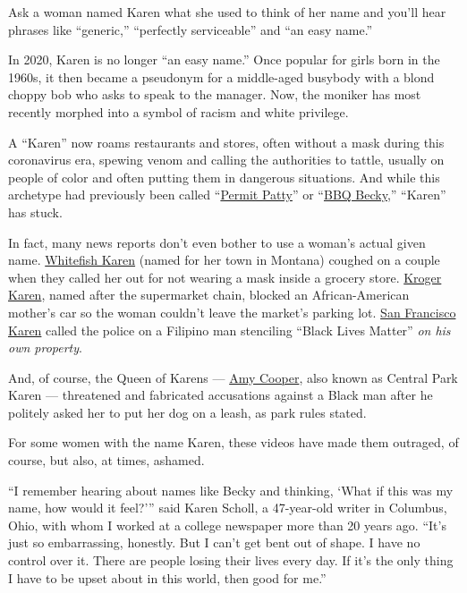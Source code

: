 Ask a woman named Karen what she used to think of her name and you'll
hear phrases like ``generic,'' ``perfectly serviceable'' and ``an easy
name.''

In 2020, Karen is no longer ``an easy name.'' Once popular for girls
born in the 1960s, it then became a pseudonym for a middle-aged busybody
with a blond choppy bob who asks to speak to the manager. Now, the
moniker has most recently morphed into a symbol of racism and white
privilege.

A ``Karen'' now roams restaurants and stores, often without a mask
during this coronavirus era, spewing venom and calling the authorities
to tattle, usually on people of color and often putting them in
dangerous situations. And while this archetype had previously been
called
``\href{https://www.cnn.com/2018/06/25/us/permit-patty-san-francisco-trnd/index.html}{Permit
Patty}'' or
``\href{https://www.newsweek.com/bbq-becky-white-woman-who-called-cops-black-bbq-911-audio-released-im-really-1103057}{BBQ
Becky},'' ``Karen'' has stuck.

In fact, many news reports don't even bother to use a woman's actual
given name. \href{https://www.youtube.com/watch?v=qHqzg3vgW4I}{Whitefish
Karen} (named for her town in Montana) coughed on a couple when they
called her out for not wearing a mask inside a grocery store.
\href{https://www.metrotimes.com/news-hits/archives/2020/06/17/metro-detroits-own-kroger-karen-prevents-black-customer-from-leaving-the-parking-lot-in-viral-video}{Kroger
Karen}, named after the supermarket chain, blocked an African-American
mother's car so the woman couldn't leave the market's parking lot.
\href{https://sfist.com/2020/06/14/sf-karen-filmed-confronting-pacific-heights-man-over-writing-black-lives-matter-on-his-property/}{San
Francisco Karen} called the police on a Filipino man stenciling ``Black
Lives Matter'' \emph{on his own property}.

And, of course, the Queen of Karens ---
\href{https://www.nytimes.com/2020/06/14/nyregion/central-park-amy-cooper-christian-racism.html}{Amy
Cooper}, also known as Central Park Karen --- threatened and fabricated
accusations against a Black man after he politely asked her to put her
dog on a leash, as park rules stated.

For some women with the name Karen, these videos have made them
outraged, of course, but also, at times, ashamed.

``I remember hearing about names like Becky and thinking, `What if this
was my name, how would it feel?''' said Karen Scholl, a 47-year-old
writer in Columbus, Ohio, with whom I worked at a college newspaper more
than 20 years ago. ``It's just so embarrassing, honestly. But I can't
get bent out of shape. I have no control over it. There are people
losing their lives every day. If it's the only thing I have to be upset
about in this world, then good for me.''


